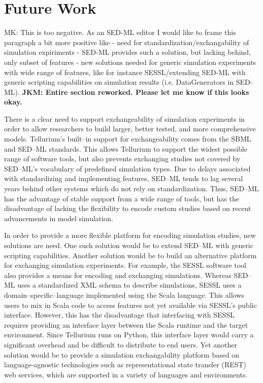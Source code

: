 \documentclass[10pt,letterpaper]{article}
\begin{document}
\section*{Future Work}

{\color{orange} MK: This is too negative. As an SED-ML editor I would like to frame this paragraph a bit more positive like
 - need for standardization/exchangability of simulation expiriments
 - SED-ML provides such a solution, but lacking behind, only subset of features
 - new solutions needed for generic simulation experiments with wide range of features, like for instance SESSL/extending SED-ML with generic scripting capabilities on simulation results (i.e. DataGenerators in SED-ML). }
\textbf{JKM: Entire section reworked. Please let me know if this looks okay.}

There is a clear need to support exchangeability of simulation experiments in order to allow researchers to build larger, better tested, and more comprehensive models. Tellurium's built--in support for exchangeability comes from the SBML and SED--ML standards. This allows Tellurium to support the widest possible range of software tools, but also prevents exchanging studies not covered by SED--ML's vocabulary of predefined simulation types. Due to delays associated with standardizing and implementing features, SED--ML tends to lag several years behind other systems which do not rely on standardization. Thus, SED--ML has the advantage of stable support from a wide range of tools, but has the disadvantage of lacking the flexibility to encode custom studies based on recent advancements in model simulation.

In order to provide a more flexible platform for encoding simulation studies, new solutions are need. One such solution would be to extend SED--ML with generic scripting capabilities. Another solution would be to build an alternative platform for exchanging simulation experiments. For example, the SESSL \cite{ewald2014sessl} software tool also provides a means for encoding and exchanging simulations. Whereas SED--ML uses a standardized XML schema to describe simulations, SESSL uses a domain--specific--language implemented using the Scala language. This allows users to mix in Scala code to access features not yet available via SESSL's public interface. However, this has the disadvantage that interfacing with SESSL requires providing an interface layer between the Scala runtime and the target environment. Since Tellurium runs on Python, this interface layer would carry a significant overhead and be difficult to distribute to end users. Yet another solution would be to provide a simulation exchangability platform based on language-agnostic technologies such as representational state transfer (REST) web services, which are supported in a variety of languages and environments.
\end{document}
